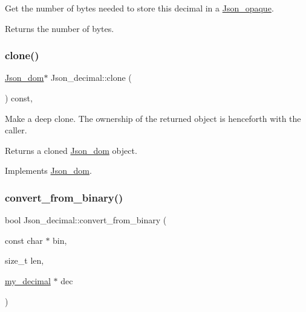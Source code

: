 Get the number of bytes needed to store this decimal in a \mbox{\hyperlink{classJson__opaque}{Json\+\_\+opaque}}. \begin{DoxyReturn}{Returns}
the number of bytes. 
\end{DoxyReturn}
\mbox{\label{classJson__decimal_a73afc8bc022cc9d7a31e4404613933ff}} 
\subsubsection{\texorpdfstring{clone()}{clone()}}
{\footnotesize\ttfamily \mbox{\hyperlink{classJson__dom}{Json\+\_\+dom}}$\ast$ Json\+\_\+decimal\+::clone (\begin{DoxyParamCaption}{ }\end{DoxyParamCaption}) const\hspace{0.3cm}{\ttfamily [inline]}, {\ttfamily [virtual]}}

Make a deep clone. The ownership of the returned object is henceforth with the caller.

\begin{DoxyReturn}{Returns}
a cloned \mbox{\hyperlink{classJson__dom}{Json\+\_\+dom}} object. 
\end{DoxyReturn}


Implements \mbox{\hyperlink{classJson__dom_a03c529d590cc4cdb747ccb82f4b70fb5}{Json\+\_\+dom}}.

\mbox{\label{classJson__decimal_ac9b373f1acb0c29a32caf136d1f9e31a}} 
\subsubsection{\texorpdfstring{convert\+\_\+from\+\_\+binary()}{convert\_from\_binary()}}
{\footnotesize\ttfamily bool Json\+\_\+decimal\+::convert\+\_\+from\+\_\+binary (\begin{DoxyParamCaption}\item[{const char $\ast$}]{bin,  }\item[{size\+\_\+t}]{len,  }\item[{\mbox{\hyperlink{classmy__decimal}{my\+\_\+decimal}} $\ast$}]{dec }\end{DoxyParamCaption})\hspace{0.3cm}{\ttfamily [static]}}

